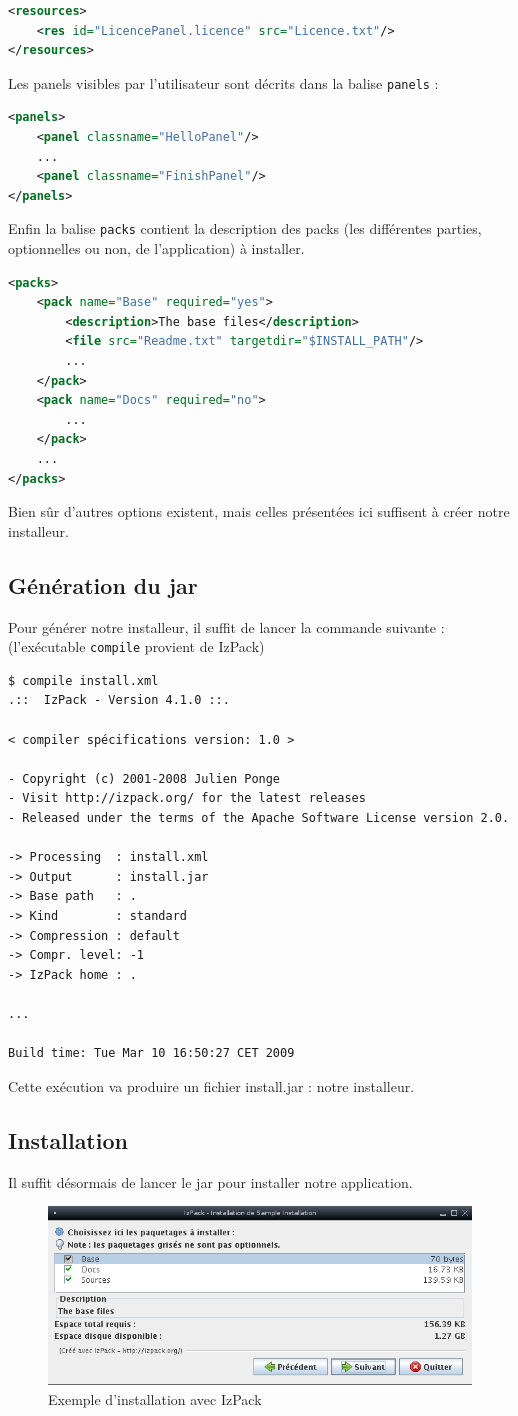 \begin{lstlisting}[language=xml]
<resources>
	<res id="LicencePanel.licence" src="Licence.txt"/>
</resources>
\end{lstlisting}
Les panels visibles par l'utilisateur sont décrits dans la balise \verb|panels| :
\begin{lstlisting}[language=xml]
<panels>
	<panel classname="HelloPanel"/>
	...
	<panel classname="FinishPanel"/>
</panels>
\end{lstlisting}
Enfin la balise \verb|packs| contient la description des packs (les différentes parties, optionnelles ou non, de l'application) à installer.
\begin{lstlisting}[language=xml]
<packs>
	<pack name="Base" required="yes">
		<description>The base files</description>
		<file src="Readme.txt" targetdir="$INSTALL_PATH"/>
		...
	</pack>
	<pack name="Docs" required="no">
		...
	</pack>
	...
</packs>
\end{lstlisting}
Bien sûr d'autres options existent, mais celles présentées ici suffisent à créer notre installeur.
\subsection{Génération du jar}
Pour générer notre installeur, il suffit de lancer la commande suivante : (l'exécutable \verb|compile| provient de IzPack)
\begin{verbatim}
$ compile install.xml
.::  IzPack - Version 4.1.0 ::.

< compiler spécifications version: 1.0 >

- Copyright (c) 2001-2008 Julien Ponge
- Visit http://izpack.org/ for the latest releases
- Released under the terms of the Apache Software License version 2.0.

-> Processing  : install.xml
-> Output      : install.jar
-> Base path   : .
-> Kind        : standard
-> Compression : default
-> Compr. level: -1
-> IzPack home : .

...

Build time: Tue Mar 10 16:50:27 CET 2009
\end{verbatim}
Cette exécution va produire un fichier install.jar : notre installeur.
\subsection{Installation}
Il suffit désormais de lancer le jar pour installer notre application.
\begin{figure}[H]
	\centering
	\includegraphics[width=15cm]{../image/installSample.png}
	\caption{Exemple d'installation avec IzPack}
\end{figure}

